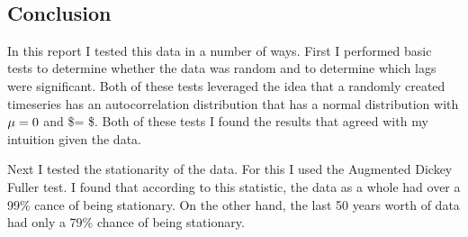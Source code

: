 \documentclass[11pt]{article}
\begin{document}
    \begin{center}
    \end{center}
    { \hspace*{\fill} \\}
    
    \subsection{Conclusion}\label{conclusion}

    In this report I tested this data in a number of ways. First I performed
basic tests to determine whether the data was random and to determine
which lags were significant. Both of these tests leveraged the idea that
a randomly created timeseries has an autocorrelation distribution that
has a normal distribution with \(\mu \space = \space 0\) and
\$\sigma \space = \space {} \$. Both of these tests I
found the results that agreed with my intuition given the data.

Next I tested the stationarity of the data. For this I used the
Augmented Dickey Fuller test. I found that according to this statistic,
the data as a whole had over a 99\% cance of being stationary. On the
other hand, the last 50 years worth of data had only a 79\% chance of
being stationary.


    
    
    
    
\end{document}
